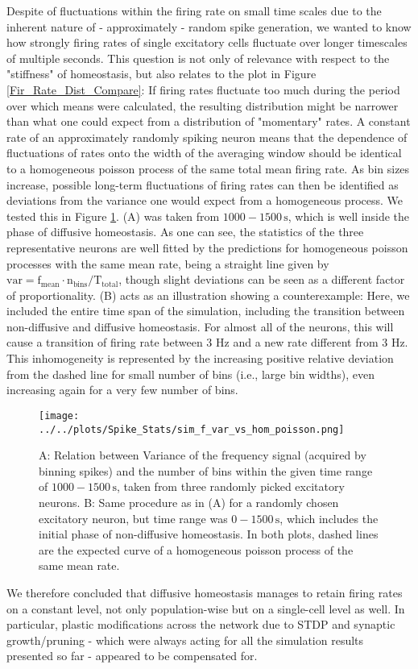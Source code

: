 \documentclass[10pt,a4paper]{article}
\begin{document}
Despite of fluctuations within the firing rate on small time scales due to the inherent nature of - approximately - random spike generation, we wanted to know how strongly firing rates of single excitatory cells fluctuate over longer timescales of multiple seconds. This question is not only of relevance with respect to the "stiffness" of homeostasis, but also relates to the plot in Figure \ref{Fir_Rate_Dist_Compare}: If firing rates fluctuate too much during the period over which means were calculated, the resulting distribution might be narrower than what one could expect from a distribution of "momentary" rates. A constant rate of an approximately randomly spiking neuron means that the dependence of fluctuations of rates onto the width of the averaging window should be identical to a homogeneous poisson process of the same total mean firing rate. As bin sizes increase, possible long-term fluctuations of firing rates can then be identified as deviations from the variance one would expect from a homogeneous process. We tested this in Figure \ref{f_Var_vs_n_Bin}. (A) was taken from $\mathrm{1000-1500\,s}$, which is well inside the phase of diffusive homeostasis. As one can see, the statistics of the three representative neurons are well fitted by the predictions for homogeneous poisson processes with the same mean rate, being a straight line given by $\mathrm{var = f_{mean}\cdot n_{bins}/T_{total}}$, though slight deviations can be seen as a different factor of proportionality. (B) acts as an illustration showing a counterexample: Here, we included the entire time span of the simulation, including the transition between non-diffusive and diffusive homeostasis. For almost all of the neurons, this will cause a transition of firing rate between 3 Hz and a new rate different from 3 Hz. This inhomogeneity is represented by the increasing positive relative deviation from the dashed line for small number of bins (i.e., large bin widths), even increasing again for a very few number of bins.
\begin{figure}
\texttt{[image: ../../plots/Spike\_Stats/sim\_f\_var\_vs\_hom\_poisson.png]}
\caption{A: Relation between Variance of the frequency signal (acquired by binning spikes) and the number of bins within the given time range of $\mathrm{1000-1500\,s}$, taken from three randomly picked excitatory neurons. B: Same procedure as in (A) for a randomly chosen excitatory neuron, but time range was $\mathrm{0-1500\,s}$, which includes the initial phase of non-diffusive homeostasis. In both plots, dashed lines are the expected curve of a homogeneous poisson process of the same mean rate.}
\label{f_Var_vs_n_Bin}
\end{figure}
We therefore concluded that diffusive homeostasis manages to retain firing rates on a constant level, not only population-wise but on a single-cell level as well. In particular, plastic modifications across the network due to STDP and synaptic growth/pruning - which were always acting for all the simulation results presented so far - appeared to be compensated for.
\end{document}
